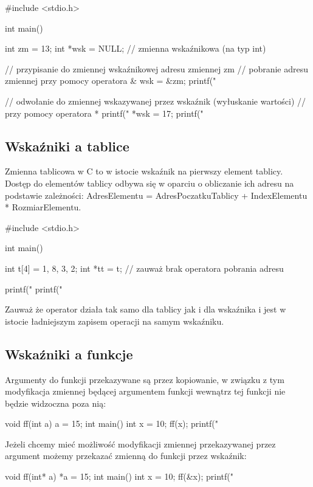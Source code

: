 \begin{CodeFrame*}[c]{}
#include <stdio.h>

int main() {
    int zm = 13;
    int *wsk = NULL; // zmienna wskaźnikowa (na typ int)
    
    // przypisanie do zmiennej wskaźnikowej adresu zmiennej zm
    // pobranie adresu zmiennej przy pomocy operatora &
    wsk = &zm;
    printf("%
    
    // odwołanie do zmiennej wskazywanej przez wskaźnik (wyłuskanie wartości)
    // przy pomocy operatora *
    printf("%
    *wsk = 17;
    printf("%
}
\end{CodeFrame*}

\subsection{Wskaźniki a tablice}

Zmienna tablicowa w C to w istocie wskaźnik na pierwszy element tablicy.
Dostęp do elementów tablicy odbywa się w oparciu o obliczanie ich adresu na podstawie zależności: AdresElementu = AdresPoczatkuTablicy + IndexElementu * RozmiarElementu.

\begin{CodeFrame*}[c]{}
#include <stdio.h>

int main() {
  int t[4] = {1, 8, 3, 2};
  int *tt = t; // zauważ brak operatora pobrania adresu
  
  printf("%
  printf("%
}
\end{CodeFrame*}

Zauważ że operator  działa tak samo dla tablicy jak i dla wskaźnika i jest w istocie ładniejszym zapisem operacji  na samym wskaźniku.

\subsection{Wskaźniki a funkcje}
Argumenty do funkcji przekazywane są przez kopiowanie, w związku z tym modyfikacja zmiennej będącej argumentem funkcji wewnątrz tej funkcji nie będzie widzoczna poza nią:
\begin{CodeFrame*}[c]{}
void ff(int a) {
    a = 15;
}
int main() {
    int x = 10;
    ff(x);
    printf("%
}
\end{CodeFrame*}

Jeżeli chcemy mieć możliwość modyfikacji zmiennej przekazywanej przez argument możemy przekazać zmienną do funkcji przez wskaźnik:
\begin{CodeFrame*}[c]{}
void ff(int* a) {
    *a = 15;
}
int main() {
    int x = 10;
    ff(&x);
    printf("%
}
\end{CodeFrame*}


